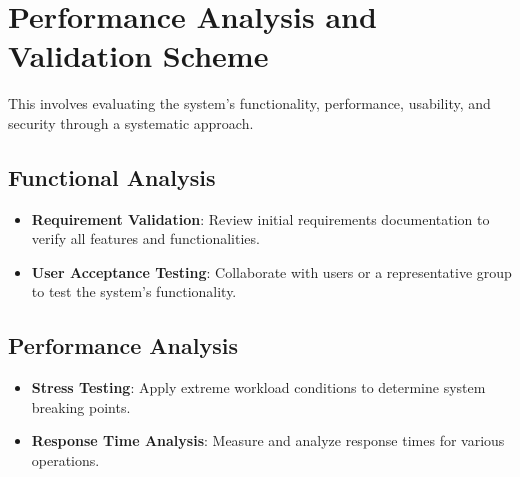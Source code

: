 \documentclass[12pt, a4paper, oneside]{article}
\begin{document}
  




\break



\break 


\section{Performance Analysis and Validation Scheme}

This involves evaluating the system's functionality, performance, usability, and security through a systematic approach.

\subsection{Functional Analysis}

\begin{itemize}
  \item \textbf{Requirement Validation}: Review initial requirements documentation to verify all features and functionalities.
  \item \textbf{User Acceptance Testing}: Collaborate with users or a representative group to test the system's functionality.
\end{itemize}

\subsection{Performance Analysis}

\begin{itemize}
  \item \textbf{Stress Testing}: Apply extreme workload conditions to determine system breaking points.
  \item \textbf{Response Time Analysis}: Measure and analyze response times for various operations.
\end{itemize}
\end{document}

